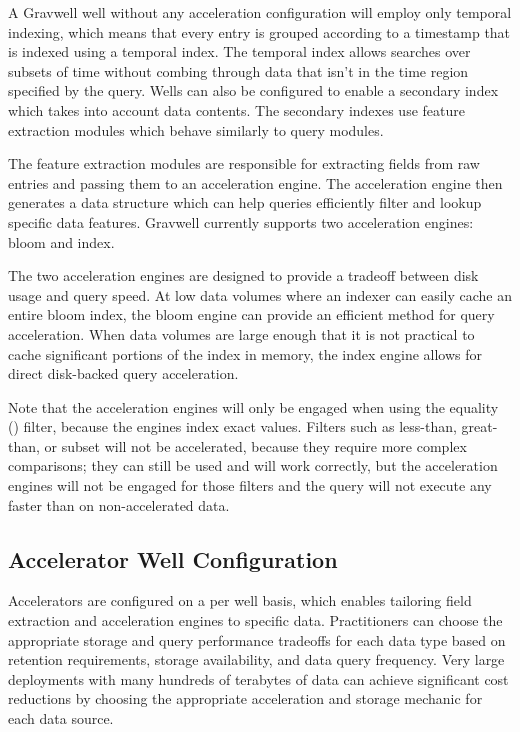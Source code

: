 {A Gravwell well without any acceleration configuration will employ only
temporal indexing, which means that every entry is grouped according to a
timestamp that is indexed using a temporal index. The temporal index
allows searches over subsets of time without combing through data
that isn't in the time region specified by the query. Wells can also be
configured to enable a secondary index which takes into account data
contents. The secondary indexes use feature extraction modules which
behave similarly to query modules.

The feature extraction modules are responsible for extracting fields
from raw entries and passing them to an acceleration engine. The
acceleration engine then generates a data structure which can help
queries efficiently filter and lookup specific data features. Gravwell
currently supports two acceleration engines: bloom and index.

The two acceleration engines are designed to provide a tradeoff between
disk usage and query speed. At low data volumes where an indexer can
easily cache an entire bloom index, the bloom engine can provide an
efficient method for query acceleration. When data volumes are large
enough that it is not practical to cache significant portions of the
index in memory, the index engine allows for direct disk-backed query
acceleration.

Note that the acceleration engines will only be engaged when using
the equality (\code{==}) filter, because
the engines index exact values. Filters such as less-than, great-than,
or subset will not be accelerated, because they require more complex
comparisons; they can still be used and will work correctly, but the acceleration
engines will not be engaged for those filters and the query will
not execute any faster than on non-accelerated data.

\subsection{Accelerator Well Configuration}

Accelerators are configured on a per well basis, which enables
tailoring field extraction and acceleration engines to specific data.
Practitioners can choose the appropriate storage and query performance
tradeoffs for each data type based on retention requirements, storage
availability, and data query frequency. Very large deployments with
many hundreds of terabytes of data can achieve significant cost
reductions by choosing the appropriate acceleration and storage mechanic
for each data source.

}
